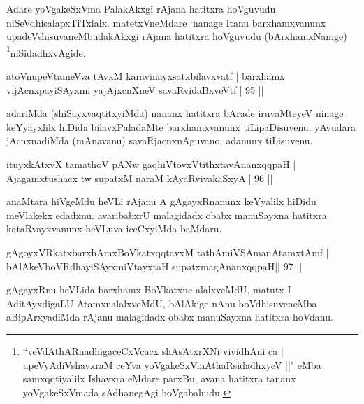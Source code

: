 \begin{artha}
Adare yoVgakeSxVma PalakAkxgi rAjana hatitxra hoVguvudu 
niSeVdhisalapxTiTxlalx. matetxVneMdare `nanage Itanu barxhamxvanunx 
upadeVshisuvaneMbudakAkxgi rAjana hatitxra hoVguvudu (bArxhamxNanige) 
\footnote[11]{``veVdAthARnadhigaceCxVcacx shAsAtxrXNi vividhAni ca | 
upeVyAdiVshavxraM ceYva yoVgakeSxVmAthaRsidadhxyeV ||" eMba samxqqtiyalilx Ishavxra eMdare parxBu, avana hatitxra tananx yoVgakeSxVmada sAdhanegAgi hoVgabahudu.}niSidadhxvAgide.
\end{artha}

\begin{shl}
atoV\s nupeVtameVva tAvxM karavinayxsatxbilavxvatf |
barxhamx vijAcnxpayiSAyxmi yajAjxcnXneV savaRvidaBxveVtf\hfill || 95 ||
\end{shl}

\begin{artha}
adariMda (shiSayxvaqtitxyiMda) nananx hatitxra bArade iruvaMteyeV  ninage keYyayxlilx hiDida bilavxPaladaMte barxhamxvanunx  tiLipaDisuvenu. yAvudara jAcnxnadiMda (mAnavanu) savaRjacnxnAguvano, adanunx tiLisuvenu.
\end{artha}

\begin{shl}
ituyxkAtxvX tamathoV pANw gaqhiVtovxVtithxtavAnanxqqpaH |
Ajagamxtushacx tw supatxM naraM kAyaRvivakaSxyA\hfill || 96 ||
\end{shl}

\begin{artha}
anaMtara hiVgeMdu heVLi rAjanu A gAgayxRnanunx keYyalilx hiDidu meVlakekx edadxnu. avaribabxrU malagidadx obabx manuSayxna hatitxra kataRvayxvanunx heVLuva iceCxyiMda baMdaru.
\end{artha} 
 


\begin{shl}
gAgoyxVRkatxbarxhAmxBoVkatxqqtavxM tathA\s miVSAmanAtamxtAmf |
bAlAkeVboVRdhayiSAyxmiVtayxtaH supatxmagAnanxqqpaH\hfill || 97 ||
\end{shl}

\begin{artha}
gAgayxRnu heVLida barxhamx BoVkatxne alalxveMdU, matutx I AditAyxdigaLU AtamxnalalxveMdU, bAlAkige nAnu boVdhisuveneMba aBipArxyadiMda rAjanu malagidadx obabx manuSayxna hatitxra hoVdanu.
\end{artha}
 
